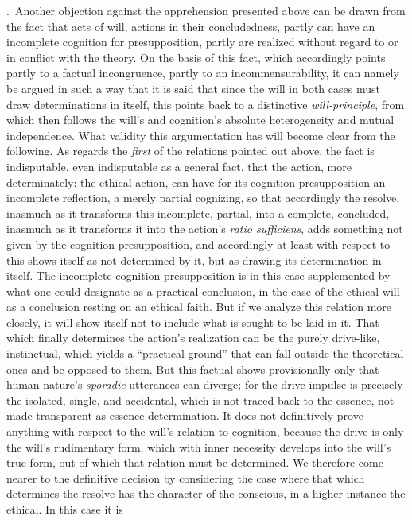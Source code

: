 \documentclass[12pt,a4paper]{book}
\begin{document}
\medskip

.~Another objection against the apprehension presented above can be drawn from the fact
that acts of will, actions in their concludedness, partly can have an incomplete cognition for
presupposition, partly are realized without regard to or in conflict with the theory. On the basis
of this fact, which accordingly points partly to a factual incongruence, partly to an
incommensurability, it can namely be argued in such a way that it is said that since the will in
both cases must draw determinations in itself, this points back to a distinctive \emph{will-principle},
from which then follows the will's and cognition's absolute heterogeneity and mutual independence.
What validity this argumentation has will become clear from the following. As regards the \emph{first} of
the relations pointed out above, the fact is indisputable, even indisputable as a general fact,
that the action, more determinately: the ethical action, can have for its cognition-presupposition
an incomplete reflection, a merely partial cognizing, so that accordingly the resolve, inasmuch as
it transforms this incomplete, partial, into a complete, concluded, inasmuch as it transforms it
into the action's \textit{ratio sufficiens}, adds something not given by the cognition-presupposition,
and accordingly at least with respect to this shows itself as not determined by it, but as drawing
its determination in itself. The incomplete cognition-presupposition is in this case supplemented
by what one could designate as a practical conclusion, in the case of the ethical will as a
conclusion resting on an ethical faith. But if we analyze this relation more closely, it will show
itself not to include what is sought to be laid in it. That which finally determines the action's
realization can be the purely drive-like, instinctual, which yields a ``practical ground'' that can
fall outside the theoretical ones and be opposed to them. But this factual shows provisionally only
that human nature's \emph{sporadic} utterances can diverge; for the drive-impulse is precisely the
isolated, single, and accidental, which is not traced back to the essence, not made transparent as
essence-determination. It does not definitively prove anything with respect to the will's relation
to cognition, because the drive is only the will's rudimentary form, which with inner necessity
develops into the will's true form, out of which that relation must be determined. We therefore
come nearer to the definitive decision by considering the case where that which determines the
resolve has the character of the conscious, in a higher instance the ethical. In this case it is
\end{document}
